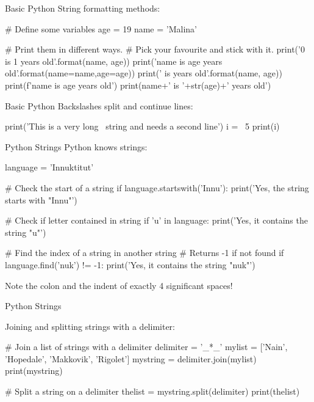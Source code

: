 \documentclass[ignorenonframetext,xcolor=x11names]{beamer}
\begin{document}
\begin{frame}[label=full,fragile]{Basic Python}
String formatting methods:
\footnotesize
\begin{pythoncode}
# Define some variables
age = 19
name = 'Malina'

# Print them in different ways.
# Pick your favourite and stick with it.
print('{0} is {1} years old'.format(name, age))
print('{name} is {age} years old'.format(name=name,age=age))
print('{} is {} years old'.format(name, age))
print(f'{name} is {age} years old')
print(name+' is '+str(age)+' years old')
\end{pythoncode}
\end{frame}

\begin{frame}[label=full,fragile]{Basic Python}
Backslashes split and continue lines:
\footnotesize
\begin{pythoncode}
print('This is a very long \
string and needs a second line')
i = \
5
print(i)
\end{pythoncode}
\end{frame}

\begin{frame}[label=full,fragile]{Python Strings}
Python knows strings:

\begin{pythoncode}
language = 'Innuktitut'

# Check the start of a string
if language.startswith('Innu'):
    print('Yes, the string starts with "Innu"')
    
# Check if letter contained in string
if 'u' in language:
    print('Yes, it contains the string "u"')
    
# Find the index of a string in another string
# Returns -1 if not found
if language.find('nuk') != -1:
    print('Yes, it contains the string "nuk"')
\end{pythoncode}

Note the colon and the indent of exactly 4 significant spaces!
\end{frame}

\begin{frame}[label=full,fragile]{Python Strings}

Joining and splitting strings with a delimiter:

\begin{pythoncode}
# Join a list of strings with a delimiter
delimiter = '_*_'
mylist = ['Nain', 'Hopedale', 'Makkovik', 'Rigolet']
mystring = delimiter.join(mylist)
print(mystring)

# Split a string on a delimiter
thelist = mystring.split(delimiter)
print(thelist)
\end{pythoncode}
\end{frame}
\end{document}
